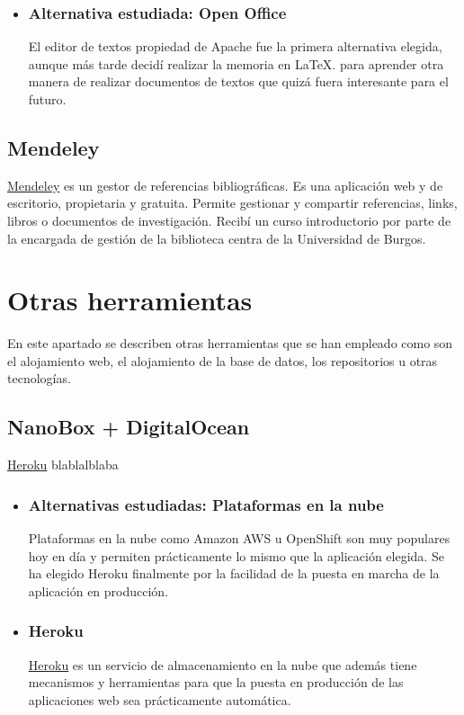  \begin{itemize}
 	\item 	\subsubsection{Alternativa estudiada: Open Office}\label{openoffice}
El editor de textos propiedad de Apache fue la primera alternativa elegida, aunque más tarde decidí realizar la memoria en La\TeX. para aprender otra manera de realizar documentos de textos que quizá fuera interesante para el futuro.
\end{itemize}

 \subsection{Mendeley}\label{docs_mendeley}
  \href{www.mendeley.com/}{Mendeley} es un gestor de referencias bibliográficas. Es una aplicación web y de escritorio, propietaria y gratuita. Permite gestionar y compartir referencias, links, libros o documentos de investigación. Recibí un curso introductorio por parte de la encargada  de gestión de la biblioteca centra de la Universidad de Burgos.
  
  \section{Otras herramientas}\label{otrasherramientas}
En este apartado se describen otras herramientas que se han empleado como son el alojamiento web, el alojamiento de la base de datos, los repositorios u otras tecnologías.

 \subsection{NanoBox + DigitalOcean}
\href{https://www.heroku.com/}{Heroku}  blablalblaba

 \begin{itemize}
 	\item 	 \subsubsection{Alternativas estudiadas: Plataformas en la nube}\label{tnube}
  Plataformas en la nube como Amazon AWS u OpenShift son muy populares hoy en día y permiten prácticamente lo mismo que la aplicación elegida. Se ha elegido Heroku finalmente por la facilidad de la puesta en marcha de la aplicación en producción.
   \item    \subsubsection{Heroku}\label{otrasherramientas_heroku}
\href{https://www.heroku.com/}{Heroku}  es un servicio de almacenamiento en la nube que además tiene mecanismos y herramientas para que la puesta en producción de las aplicaciones web sea prácticamente automática.
\end{itemize}



